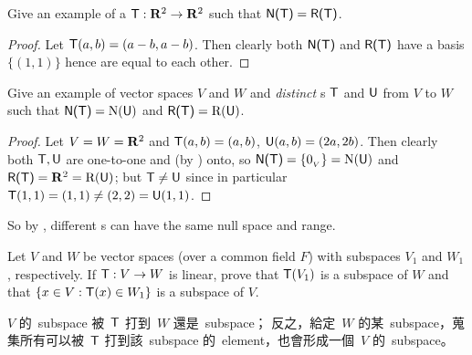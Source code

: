 \begin{exercise} \label{exercise 2.1.18}
Give an example of a \LTRAN{} \(\textsf{T}: \mathbf{R}^2 \to \mathbf{R}^2\) such that \(\textsf{N(T)} = \textsf{R(T)}\).
\end{exercise}

\begin{proof}
Let \(\textsf{T}(a, b) = (a - b, a - b)\).
Then clearly both \(\textsf{N(T)}\) and \(\textsf{R(T)}\) have a basis \(\{ (1, 1) \}\) hence are equal to each other.
\end{proof}

\begin{exercise} \label{exercise 2.1.19}
Give an example of vector spaces \(V\) and \(W\) and \emph{distinct} \LTRAN{}s \(\textsf{T}\) and \(\textsf{U}\) from \(V\) to \(W\) such that \(\textsf{N(T)} = \mathrm{N}(\textsf{U})\) and \(\textsf{R(T)} = \mathrm{R}(\textsf{U})\).
\end{exercise}

\begin{proof}
Let \(V = W = \mathbf{R}^2\) and \(\textsf{T}(a, b) = (a, b)\), \(\textsf{U}(a, b) = (2a, 2b)\).
Then clearly both \(\textsf{T}, \textsf{U}\) are one-to-one and (by ) onto, so \(\textsf{N(T)} = \{ 0_{_V} \} = \mathrm{N}(\textsf{U})\) and \(\textsf{R(T)} = \mathbf{R}^2 = \mathrm{R}(\textsf{U})\);
but \(\textsf{T} \ne \textsf{U}\) since in particular \(\textsf{T}(1, 1) = (1, 1) \ne (2, 2) = \textsf{U}(1, 1)\).
\end{proof}

\begin{note}
So by , different \LTRAN{}s can have the same null space and range.
\end{note}

\begin{exercise} \label{exercise 2.1.20}
Let \(V\) and \(W\) be vector spaces (over a common field \(F\)) with subspaces \(V_1\) and \(W_1\), respectively.
If \(\textsf{T} : V \to W\) is linear, prove that \(\textsf{T}(V_1)\) is a subspace of \(W\) and that \(\{ x \in V: \textsf{T}(x) \in W_1 \}\) is a subspace of \(V\).
\end{exercise}

\begin{note}
\(V\) 的\ subspace 被\ \(\textsf{T}\) 打到\ \(W\) 還是\ subspace；
反之，給定\ \(W\) 的某\ subspace，蒐集所有可以被\ \(\textsf{T}\) 打到該\ subspace 的\ element，也會形成一個\ \(V\) 的\ subspace。
\end{note}

